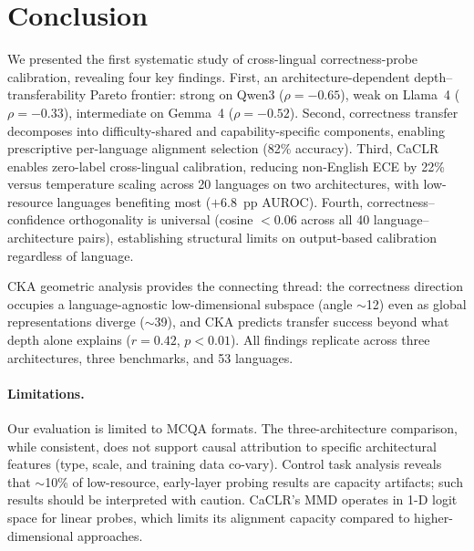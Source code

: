 \documentclass[11pt,a4paper]{article}
\begin{document}
\section{Conclusion}

We presented the first systematic study of cross-lingual correctness-probe calibration, revealing four key findings.
First, an architecture-dependent depth--transferability Pareto frontier: strong on Qwen3 ($\rho = -0.65$), weak on Llama~4 ($\rho = -0.33$), intermediate on Gemma~4 ($\rho = -0.52$).
Second, correctness transfer decomposes into difficulty-shared and capability-specific components, enabling prescriptive per-language alignment selection (82\% accuracy).
Third, CaCLR enables zero-label cross-lingual calibration, reducing non-English ECE by 22\% versus temperature scaling across 20 languages on two architectures, with low-resource languages benefiting most ($+6.8$~pp AUROC).
Fourth, correctness--confidence orthogonality is universal (cosine $< 0.06$ across all 40 language--architecture pairs), establishing structural limits on output-based calibration regardless of language.

CKA geometric analysis provides the connecting thread: the correctness direction occupies a language-agnostic low-dimensional subspace (angle $\sim$12\textdegree) even as global representations diverge ($\sim$39\textdegree), and CKA predicts transfer success beyond what depth alone explains ($r = 0.42$, $p < 0.01$).
All findings replicate across three architectures, three benchmarks, and 53 languages.

\paragraph{Limitations.}
Our evaluation is limited to MCQA formats.
The three-architecture comparison, while consistent, does not support causal attribution to specific architectural features (type, scale, and training data co-vary).
Control task analysis reveals that $\sim$10\% of low-resource, early-layer probing results are capacity artifacts; such results should be interpreted with caution.
CaCLR's MMD operates in 1-D logit space for linear probes, which limits its alignment capacity compared to higher-dimensional approaches.
\end{document}
